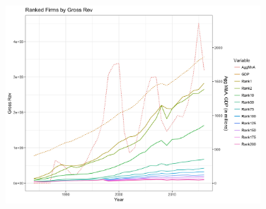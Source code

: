 \documentclass{article}
\begin{document}
\begin{figure}[H]\centering
\includegraphics[width=0.85\textwidth]{../IndivTexOutput/MnAGDP-Rev.jpg}\end{figure}
\end{document}
